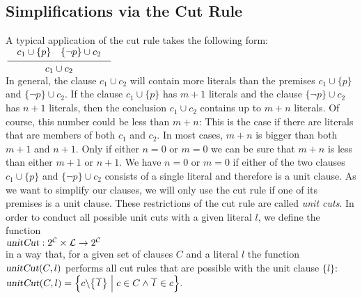 \subsection{Simplifications via the Cut Rule}
A typical application of the cut rule takes the following form: \\[0.2cm]
\hspace*{1.3cm} $\schluss{ c_1 \cup \{p\} \quad \{\neg p\} \cup c_2}{c_1 \cup c_2}$
\\[0.2cm]
In general, the clause $c_1 \cup c_2$ will contain more literals than the premises
$c_1 \cup \{p\}$ and $\bigl\{\neg p\} \cup c_2$.  If the clause
$c_1 \cup \{p\}$ has $m+1$ literals and the clause $\bigl\{\neg p\} \cup c_2$ has $n+1$
literals, then the conclusion $c_1 \cup c_2$ contains up to $m + n$ literals.  
Of course, this number could be less than $m + n$:  This is the case if there are
literals that are members of both  $c_1$ and $c_2$.  In most cases,
$m + n$ is bigger than both  $m + 1$ and $n + 1$.  Only if either  $n = 0$ or $m = 0$ we
can be sure that $m + n$ is less than either $m +1$ or $n + 1$.
We have $n = 0$ or $m = 0$ if either of the two clauses $c_1 \cup \{p\}$ 
and $\bigl\{\neg p\} \cup c_2$ consists of a single literal and
therefore is a unit clause.  As we want to simplify our clauses, we will only use the cut
rule if one of its premises is a unit clause.  These restrictions of the cut rule are
called \emph{unit cuts}.  In order to conduct all possible unit cuts with a given literal $l$,
we define the function
\\[0.2cm]
\hspace*{1.3cm}
$\textsl{unitCut}: 2^\mathcal{C} \times \mathcal{L} \rightarrow 2^\mathcal{C}$
\\[0.2cm]
in a way that, for a given set of clauses $C$ and a literal $l$ the function
$\textsl{unitCut}(C,l)$ performs all cut rules that are possible with the unit clause 
$\{l\}$:
\\[0.2cm]
\hspace*{1.3cm}
$\textsl{unitCut}(C,l) = 
  \Bigl\{ c \backslash \bigl\{ \overline{\,l\,} \bigr\} \;\Big|\; 
          c \in C \wedge \overline{\,l\,} \in c
  \Bigr\}.
$

